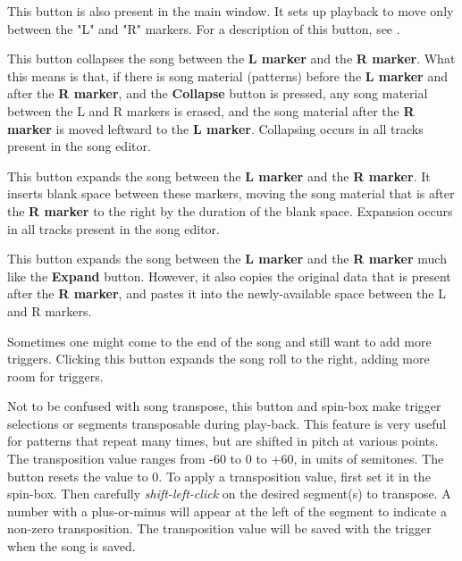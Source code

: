    This button is also present in the main window.
   It sets up playback to move only between the "L" and "R" markers.
   For a description of this button, see
   .

   This button collapses the song between the \textbf{L marker} and the
   \textbf{R marker}.
   What this means is that, if there is song material (patterns) before the
   \textbf{L marker} and after the \textbf{R marker},
   and the \textbf{Collapse} button is
   pressed, any song material between the L and R markers is erased, and
   the song material after the \textbf{R marker} is moved leftward to
   the \textbf{L marker}.
   Collapsing occurs in all tracks present in the song editor.

   This button expands the song between the
   \textbf{L marker} and the \textbf{R marker}.
   It inserts blank space between these markers, moving the song material
   that is after the \textbf{R marker}
   to the right by the duration of the blank space.
   Expansion occurs in all tracks present in the song editor.

   This button expands the song between the \textbf{L marker} and the
   \textbf{R marker} much like the \textbf{Expand} button.
   However, it also copies the original data that is present after the
   \textbf{R marker}, and pastes it into the newly-available space between
   the L and R markers.

   Sometimes one might come to the end of the song and still want to
   add more triggers.
   Clicking this button expands the song roll to the right, adding
   more room for triggers.

   Not to be confused with song transpose,
   this button and spin-box make trigger selections or segments
   transposable during play-back.  This feature is very useful
   for patterns that repeat many times, but are shifted in pitch at various
   points.
   The transposition value ranges from -60 to 0 to +60, in units of semitones.
   The button resets the value to 0.
   To apply a transposition value, first set it in the spin-box.
   Then carefully \textsl{shift-left-click}
   on the desired segment(s) to transpose.
   A number with a plus-or-minus will appear at the left of the segment to
   indicate a non-zero transposition.
   The transposition value will be saved with the trigger when the song is
   saved.

